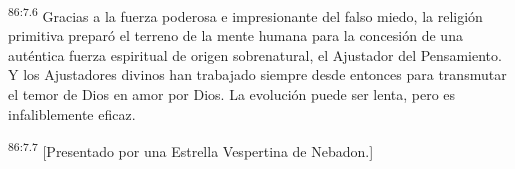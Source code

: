 \par
\textsuperscript{86:7.6} Gracias a la fuerza poderosa e impresionante del falso miedo, la religión primitiva preparó el terreno de la mente humana para la concesión de una auténtica fuerza espiritual de origen sobrenatural, el Ajustador del Pensamiento. Y los Ajustadores divinos han trabajado siempre desde entonces para transmutar el temor de Dios en amor por Dios. La evolución puede ser lenta, pero es infaliblemente eficaz.

\par
\textsuperscript{86:7.7} [Presentado por una Estrella Vespertina de Nebadon.]